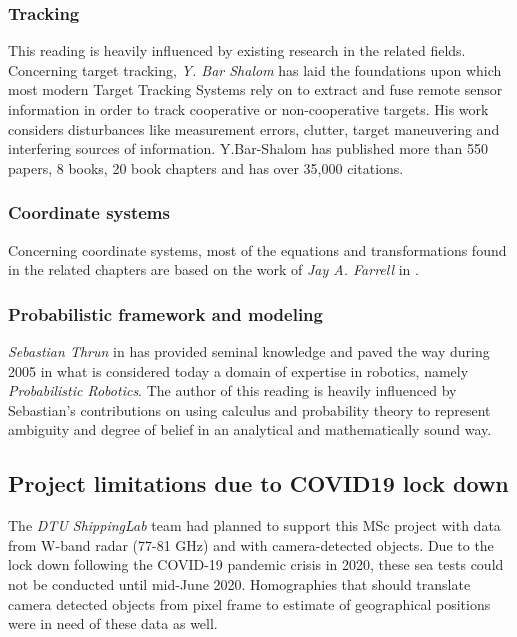 \subsubsection{Tracking}
This reading is heavily influenced by existing research in the related fields. Concerning target tracking,  \emph{Y. Bar Shalom} \Cite{BarShalom1980,Shalom1990,Shalom2001} has laid the foundations upon which most modern Target Tracking Systems rely on to extract and fuse remote sensor information in order to track cooperative or non-cooperative targets. His work considers disturbances like measurement errors, clutter, target maneuvering and interfering sources of information.  Y.Bar-Shalom has published more than 550 papers, 8 books, 20 book chapters and has over 35,000 citations. \\
\subsubsection{Coordinate systems}
Concerning coordinate systems, most of the equations and transformations found in the related chapters are based on the work of \emph{Jay A. Farrell} in \cite{Farrell2008}.\\

\subsubsection{Probabilistic framework and modeling}
\emph{Sebastian Thrun} in \cite{Thrun2005} has provided seminal knowledge and paved the way during 2005 in what is considered today a domain of expertise in robotics, namely \emph{Probabilistic Robotics}. The author of this reading is heavily influenced by Sebastian's contributions on using calculus and probability theory to represent ambiguity and degree of belief in an analytical and mathematically sound way. 

\subsection{Project limitations due to COVID19 lock down}
The \emph{DTU ShippingLab} team had planned to support this MSc project with data from W-band radar (77-81 GHz) and with camera-detected objects. Due to the lock down following the COVID-19 pandemic crisis in 2020, these sea tests could not be conducted until mid-June 2020. Homographies that should translate camera detected objects from pixel frame to estimate of geographical positions were in need of these data as well. 


